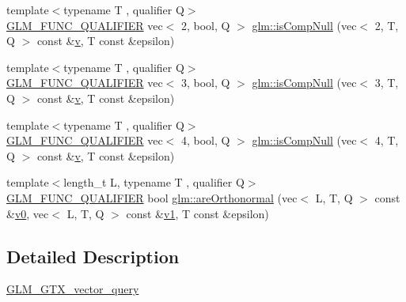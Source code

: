 \begin{DoxyCompactItemize}
\item 
{\footnotesize template$<$typename T , qualifier Q$>$ }\\\mbox{\hyperlink{setup_8hpp_a33fdea6f91c5f834105f7415e2a64407}{G\+L\+M\+\_\+\+F\+U\+N\+C\+\_\+\+Q\+U\+A\+L\+I\+F\+I\+ER}} vec$<$ 2, bool, Q $>$ \mbox{\hyperlink{namespaceglm_aa194d2ce350422b8c307778002a5429d}{glm\+::is\+Comp\+Null}} (vec$<$ 2, T, Q $>$ const \&\mbox{\hyperlink{_s_d_l__opengl_8h_a10a82eabcb59d2fcd74acee063775f90}{v}}, T const \&epsilon)
\item 
{\footnotesize template$<$typename T , qualifier Q$>$ }\\\mbox{\hyperlink{setup_8hpp_a33fdea6f91c5f834105f7415e2a64407}{G\+L\+M\+\_\+\+F\+U\+N\+C\+\_\+\+Q\+U\+A\+L\+I\+F\+I\+ER}} vec$<$ 3, bool, Q $>$ \mbox{\hyperlink{namespaceglm_a3c5f0ad7464dde1b9daa5b5a9f3141ee}{glm\+::is\+Comp\+Null}} (vec$<$ 3, T, Q $>$ const \&\mbox{\hyperlink{_s_d_l__opengl_8h_a10a82eabcb59d2fcd74acee063775f90}{v}}, T const \&epsilon)
\item 
{\footnotesize template$<$typename T , qualifier Q$>$ }\\\mbox{\hyperlink{setup_8hpp_a33fdea6f91c5f834105f7415e2a64407}{G\+L\+M\+\_\+\+F\+U\+N\+C\+\_\+\+Q\+U\+A\+L\+I\+F\+I\+ER}} vec$<$ 4, bool, Q $>$ \mbox{\hyperlink{namespaceglm_a7d5eb6f3d09e695f134999ae0b9e0aa9}{glm\+::is\+Comp\+Null}} (vec$<$ 4, T, Q $>$ const \&\mbox{\hyperlink{_s_d_l__opengl_8h_a10a82eabcb59d2fcd74acee063775f90}{v}}, T const \&epsilon)
\item 
{\footnotesize template$<$length\+\_\+t L, typename T , qualifier Q$>$ }\\\mbox{\hyperlink{setup_8hpp_a33fdea6f91c5f834105f7415e2a64407}{G\+L\+M\+\_\+\+F\+U\+N\+C\+\_\+\+Q\+U\+A\+L\+I\+F\+I\+ER}} bool \mbox{\hyperlink{group__gtx__vector__query_ga1b091c3d7f9ee3b0708311c001c293e3}{glm\+::are\+Orthonormal}} (vec$<$ L, T, Q $>$ const \&\mbox{\hyperlink{_s_d_l__opengl__glext_8h_a7062a23d1d434121d4a88f530703d06a}{v0}}, vec$<$ L, T, Q $>$ const \&\mbox{\hyperlink{_s_d_l__opengl__glext_8h_a435c176a02c061b43e19bdf7c86cceae}{v1}}, T const \&epsilon)
\end{DoxyCompactItemize}


\subsection{Detailed Description}
\mbox{\hyperlink{group__gtx__vector__query}{G\+L\+M\+\_\+\+G\+T\+X\+\_\+vector\+\_\+query}} 